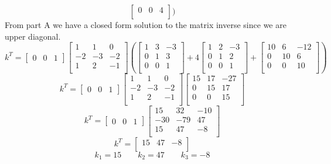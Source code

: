 \documentclass{article}
\begin{document}
\begin{enumerate}[a.]
$$\begin{bmatrix}
0 & 0 & 4 \\
\end{bmatrix}
)
$$
From part A we have a closed form solution to the matrix inverse since we are upper diagonal.
$$ k^T =
\begin{bmatrix} 0 & 0 & 1 \end{bmatrix}
\begin{bmatrix}
 1 &  1 &  0  \\
-2 & -3 & -2  \\
 1 &  2 & -1  \\
\end{bmatrix}
(
\begin{bmatrix}
1 & 3 & -3 \\
0 & 1 &  3 \\
0 & 0 &  1 \\
\end{bmatrix}
+
4
\begin{bmatrix}
1 & 2 & -3 \\
0 & 1 &  2 \\
0 & 0 &  1 \\
\end{bmatrix}
+
\begin{bmatrix}
10 & 6 & -12 \\
0 & 10 & 6 \\
0 & 0 & 10 \\
\end{bmatrix}
)
$$
$$ k^T =
\begin{bmatrix} 0 & 0 & 1 \end{bmatrix}
\begin{bmatrix}
 1 &  1 &  0  \\
-2 & -3 & -2  \\
 1 &  2 & -1  \\
\end{bmatrix}
\begin{bmatrix}
15 & 17 & -27 \\
 0 & 15 &  17 \\
 0 &  0 &  15 \\
\end{bmatrix}
$$
$$ k^T =
\begin{bmatrix} 0 & 0 & 1 \end{bmatrix}
\begin{bmatrix}
 15 &  32 & -10 \\
-30 & -79 &  47 \\
 15 &  47 &  -8 \\
\end{bmatrix}
$$
$$ k^T = \begin{bmatrix} 15 &  47 &  -8 \\ \end{bmatrix} $$
$$ k_1 = 15 \qquad k_2 = 47 \qquad k_3 = -8 $$


\end{enumerate}
\end{document}
